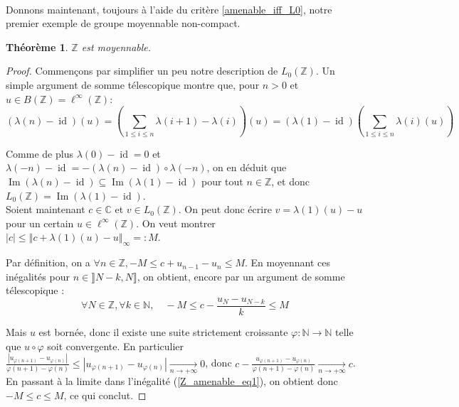 \documentclass[a4paper,12pt]{article}
\newtheorem{theorem}{Théorème}[section]
\newcommand{\N}{\mathbb{N}}
\newcommand{\Z}{\mathbb{Z}}
\newcommand{\C}{\mathbb{C}}
\newcommand{\norm}[1]{\left\Vert #1\right\Vert}
\newcommand{\abs}[1]{\left\vert#1\right\vert}
\newcommand{\comp}{\circ}
\DeclareMathOperator{\id}{id}
\DeclareMathOperator{\Ima}{Im}
\begin{document}
\paragraph{}

Donnons maintenant, toujours à l'aide du critère \ref{amenable_iff_L0}, notre premier exemple de groupe moyennable non-compact.

\begin{theorem}\label{Z_amenable}
    $\Z$ est moyennable.
\end{theorem}

\begin{proof}
    Commençons par simplifier un peu notre description de $L_0(\Z)$. Un simple argument de somme
    télescopique montre que, pour $n>0$ et $u\in B(\Z)=\ell^\infty(\Z)$:
    \begin{equation*}
        (\lambda(n)-\id)(u) = \left(\sum_{1\le i\le n} \lambda(i+1) - \lambda(i)\right)(u) = (\lambda(1)-\id)\left(\sum_{1\le i\le n} \lambda(i)(u)\right)
    \end{equation*}

    Comme de plus $\lambda(0)-\id = 0$ et $\lambda(-n)-\id = -(\lambda(n)-\id)\comp\lambda(-n)$,
    on en déduit que $\Ima(\lambda(n)-\id)\subseteq\Ima(\lambda(1)-\id)$ pour tout $n\in\Z$, et donc $L_0(\Z) = \Ima(\lambda(1)-\id)$. \\

    Soient maintenant $c\in\C$ et $v\in L_0(\Z)$. On peut donc écrire $v = \lambda(1)(u)-u$ pour un certain $u\in\ell^\infty(\Z)$. 
    On veut montrer $\abs{c}\le\norm{c + \lambda(1)(u) - u}_\infty =: M$. 

    Par définition, on a $\forall n\in\Z, -M\le c+u_{n-1}-u_n\le M$. En moyennant ces inégalités pour 
    $n\in\rrbracket N-k, N\rrbracket$, on obtient, encore par un argument de somme télescopique :
    \begin{equation}\label{Z_amenable_eq1}
        \forall N\in\Z, \forall k\in\N,\quad -M\le c-\frac{u_N - u_{N-k}}{k} \le M
    \end{equation}

    Mais $u$ est bornée, donc il existe une suite strictement croissante $\varphi:\N\to\N$ telle que $u\comp\varphi$
    soit convergente. En particulier $\frac{\abs{u_{\varphi(n+1)}-u_{\varphi(n)}}}{\varphi(n+1)-\varphi(n)}\le\abs{u_{\varphi(n+1)}-u_{\varphi(n)}}\xrightarrow[n\to+\infty]{}0$, 
    donc $c-\frac{u_{\varphi(n+1)}-u_{\varphi(n)}}{\varphi(n+1)-\varphi(n)}\xrightarrow[n\to+\infty]{}c$. En passant à la limite dans l'inégalité (\ref{Z_amenable_eq1}),
    on obtient donc $-M\le c\le M$, ce qui conclut.
\end{proof}
\end{document}
